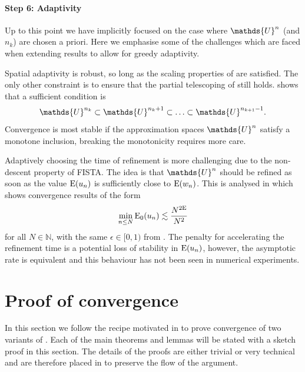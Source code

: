 \documentclass[10pt,a4paper,onecolumn]{article}
\numberwithin{equation}{section}
\let\F\mathds\let\C\mathcal\newcommand{\R}{\F{R}}\newcommand{\A}{\C{A}}
\newcommand{\op}[1]{\operatorname{#1}}\newcommand{\overtext}[2]{\stackrel{\text{#1}}{#2}}
\newcounter{adaptStepCounter}
\newenvironment{adaptiveStep}{\refstepcounter{adaptStepCounter}}{}
\newcommand*{\Func}[1]{%
	\IfEqCase{#1}{%
		{0}{\op{E}}%
		{1}{\op{F}}%
		{2}{\op{G}}%
		{3}{\op{H}}%
	}[\op{F}#1]%
}
\newcommand*{\varf}[1]{%
	\IfEqCase{#1}{%
		{0}{u}%
		{1}{v}%
		{2}{w}%
	}[u#1]%
}
\newcommand*{\spcf}[1]{%
	\IfEqCase{#1}{%
		{0}{\F{U}}%
		{1}{\F{V}}%
		{2}{\F{W}}%
	}[\F{U}#1]%
}
\begin{document}
\paragraph{Step 6: Adaptivity}
\begin{adaptiveStep}\label{step: step 6 adaptivity}
	Up to this point we have implicitly focused on the case where $\spcf0^n$ (and $n_k$) are chosen a priori. Here we emphasise some of the challenges which are faced when extending results to allow for greedy adaptivity.
	
	Spatial adaptivity is robust, so long as the scaling properties of  are satisfied. The only other constraint is to ensure that the partial telescoping of  still holds.  shows that a sufficient condition is
	$$\spcf0^{n_k}\subset\spcf0^{n_k+1}\subset\ldots\subset\spcf0^{n_{k+1}-1}.$$
	Convergence is most stable if the approximation spaces $\spcf0^n$ satisfy a monotone inclusion, breaking the monotonicity requires more care.
	
	Adaptively choosing the time of refinement is more challenging due to the non-descent property of FISTA. The idea is that $\spcf0^n$ should be refined as soon as the value $\Func0(\varf0_n)$ is sufficiently close to $\Func0(\varf2_n)$. This is analysed in  which shows convergence results of the form
	$$ \min_{n\leq N}\Func0_0(\varf0_n) \lesssim \frac{N^{2\epsilon}}{N^2}$$
	for all $N\in\F N$, with the same $\epsilon\in[0,1)$ from . The penalty for accelerating the refinement time is a potential loss of stability in $\Func0(\varf0_n)$, however, the asymptotic rate is equivalent and this behaviour has not been seen in numerical experiments.
\end{adaptiveStep}

\section{Proof of convergence}\label{sec: FISTA convergence}
In this section we follow the recipe motivated in  to prove convergence of two variants of . Each of the main theorems and lemmas will be stated with a sketch proof in this section. The details of the proofs are either trivial or very technical and are therefore placed in  to preserve the flow of the argument.
\end{document}
